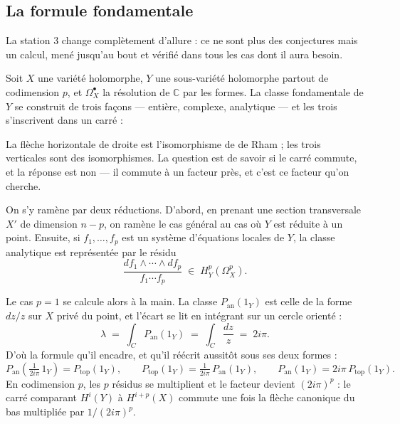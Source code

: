 \documentclass[11pt,a4paper]{article}
\begin{document}
\subsection*{La formule fondamentale}

La station 3 change complètement d'allure : ce ne sont plus des conjectures mais
un calcul, mené jusqu'au bout et vérifié dans tous les cas dont il aura besoin.

Soit $X$ une variété holomorphe, $Y$ une sous-variété holomorphe partout de
codimension $p$, et $\Omega^{\bullet}_{X}$ la résolution de $\mathbb{C}$ par les
formes. La classe fondamentale de $Y$ se construit de trois façons — entière,
complexe, analytique — et les trois s'inscrivent dans un carré :


La flèche horizontale de droite est l'isomorphisme de de Rham ; les trois
verticales sont des isomorphismes. La question est de savoir si le carré
commute, et la réponse est non — il commute à un facteur près, et c'est ce
facteur qu'on cherche.

On s'y ramène par deux réductions. D'abord, en prenant une section transversale
$X'$ de dimension $n-p$, on ramène le cas général au cas où $Y$ est réduite à un
point. Ensuite, si $f_{1}, \ldots, f_{p}$ est un système d'équations locales de
$Y$, la classe analytique est représentée par le résidu
\[
  \frac{df_{1} \wedge \cdots \wedge df_{p}}{f_{1} \cdots f_{p}}
  \;\in\; H^{p}_{Y}(\Omega^{p}_{X}) .
\]

Le cas $p = 1$ se calcule alors à la main. La classe $P_{\mathrm{an}}(1_{Y})$ est
celle de la forme $dz/z$ sur $X$ privé du point, et l'écart se lit en intégrant
sur un cercle orienté :
\[
  \lambda \;=\; \int_{C} P_{\mathrm{an}}(1_{Y}) \;=\; \int_{C} \frac{dz}{z}
  \;=\; 2i\pi .
\]
D'où la formule qu'il encadre, et qu'il réécrit aussitôt sous ses deux formes :
\[
  P_{\mathrm{an}}\!\left(\tfrac{1}{2i\pi}\, 1_{Y}\right) = P_{\mathrm{top}}(1_{Y}) ,
  \qquad
  P_{\mathrm{top}}(1_{Y}) = \tfrac{1}{2i\pi}\, P_{\mathrm{an}}(1_{Y}) ,
  \qquad
  P_{\mathrm{an}}(1_{Y}) = 2i\pi\, P_{\mathrm{top}}(1_{Y}) .
\]
En codimension $p$, les $p$ résidus se multiplient et le facteur devient
$(2i\pi)^{p}$ : le carré comparant $H^{i}(Y)$ à $H^{i+p}(X)$ commute une fois la
flèche canonique du bas multipliée par $1/(2i\pi)^{p}$.
\end{document}
